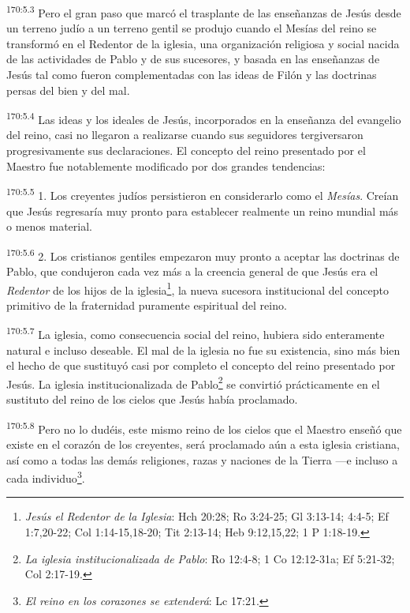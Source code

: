 \par 
\textsuperscript{170:5.3} Pero el gran paso que marcó el trasplante de las enseñanzas de Jesús desde un terreno judío a un terreno gentil se produjo cuando el Mesías del reino se transformó en el Redentor de la iglesia, una organización religiosa y social nacida de las actividades de Pablo y de sus sucesores, y basada en las enseñanzas de Jesús tal como fueron complementadas con las ideas de Filón y las doctrinas persas del bien y del mal.

\par 
\textsuperscript{170:5.4} Las ideas y los ideales de Jesús, incorporados en la enseñanza del evangelio del reino, casi no llegaron a realizarse cuando sus seguidores tergiversaron progresivamente sus declaraciones. El concepto del reino presentado por el Maestro fue notablemente modificado por dos grandes tendencias:

\par 
\textsuperscript{170:5.5} 1. Los creyentes judíos persistieron en considerarlo como el \textit{Mesías}. Creían que Jesús regresaría muy pronto para establecer realmente un reino mundial más o menos material.

\par 
\textsuperscript{170:5.6} 2. Los cristianos gentiles empezaron muy pronto a aceptar las doctrinas de Pablo, que condujeron cada vez más a la creencia general de que Jesús era el \textit{Redentor} de los hijos de la iglesia\footnote{\textit{Jesús el Redentor de la Iglesia}: Hch 20:28; Ro 3:24-25; Gl 3:13-14; 4:4-5; Ef 1:7,20-22; Col 1:14-15,18-20; Tit 2:13-14; Heb 9:12,15,22; 1 P 1:18-19.}, la nueva sucesora institucional del concepto primitivo de la fraternidad puramente espiritual del reino.

\par 
\textsuperscript{170:5.7} La iglesia, como consecuencia social del reino, hubiera sido enteramente natural e incluso deseable. El mal de la iglesia no fue su existencia, sino más bien el hecho de que sustituyó casi por completo el concepto del reino presentado por Jesús. La iglesia institucionalizada de Pablo\footnote{\textit{La iglesia institucionalizada de Pablo}: Ro 12:4-8; 1 Co 12:12-31a; Ef 5:21-32; Col 2:17-19.} se convirtió prácticamente en el sustituto del reino de los cielos que Jesús había proclamado.

\par 
\textsuperscript{170:5.8} Pero no lo dudéis, este mismo reino de los cielos que el Maestro enseñó que existe en el corazón de los creyentes, será proclamado aún a esta iglesia cristiana, así como a todas las demás religiones, razas y naciones de la Tierra ---e incluso a cada individuo\footnote{\textit{El reino en los corazones se extenderá}: Lc 17:21.}.

